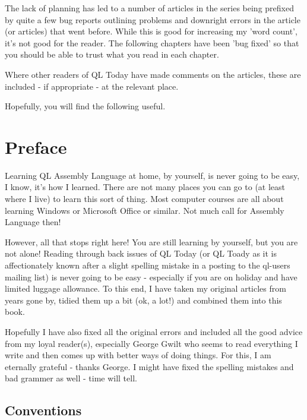 The lack of planning has led to a number of articles in the series
    being prefixed by quite a few bug reports outlining problems and downright
    errors in the article (or articles) that went before. While this is good
    for increasing my 'word count', it's not good for the reader. The
    following chapters have been 'bug fixed' so that you should be able to
    trust what you read in each chapter.

Where other readers of QL Today have made comments on the articles,
    these are included -{} if appropriate -{} at the relevant place.

Hopefully, you will find the following useful.
\setcounter{secnumdepth}{5}
\setcounter{tocdepth}{5}
\setcounter{secnumdepth}{-1}
\setcounter{tocdepth}{-1}

\chapter{Preface}
\label{introduction}%

Learning QL Assembly Language at home, by yourself, is never going to
  be easy, I know, it's how I learned. There are not many places you can go to
  (at least where I live) to learn this sort of thing. Most computer courses
  are all about learning Windows or Microsoft Office or similar. Not much call
  for Assembly Language then!

However, all that stops right here! You are still learning by
  yourself, but you are not alone! Reading through back issues of QL Today (or
  QL Toady as it is affectionately known after a slight spelling mistake in a
  posting to the ql-{}users mailing list) is never going to be easy -{} especially
  if you are on holiday and have limited luggage allowance. To this end, I
  have taken my original articles from years gone by, tidied them up a bit
  (ok, a lot!) and combined them into this book.

Hopefully I have also fixed all the original errors and included all
  the good advice from my loyal reader(s), especially George Gwilt who seems
  to read everything I write and then comes up with better ways of doing
  things. For this, I am eternally grateful -{} thanks George. I might have
  fixed the spelling mistakes and bad grammer as well -{} time will tell.

\section{Conventions}
\label{preface-conventions}%

